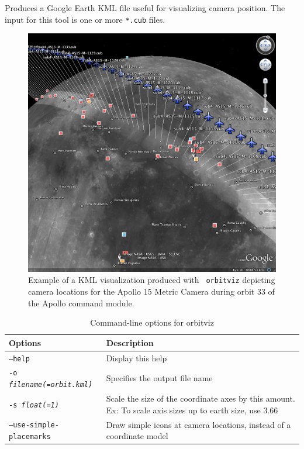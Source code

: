 Produces a Google Earth \ac{KML} file useful for visualizing camera
position. The input for this tool is one or more \texttt{*.cub} files.

\begin{figure}[ht]
  \begin{center}
  \includegraphics[width=6in]{images/orbitviz_ge_result.png}
  \end{center}
  \caption{ Example of a \ac{KML} visualization produced with {\tt
      orbitviz} depicting camera locations for the Apollo 15 Metric
    Camera during orbit 33 of the Apollo command module.}
  \label{fig:orbitviz_example}
\end{figure}

\begin{longtable}{|l|p{10cm}|}
\caption{Command-line options for orbitviz}
\label{tbl:orbitviz}
\endfirsthead
\endhead
\endfoot
\endlastfoot
\hline
Options & Description \\ \hline \hline
\texttt{--help} & Display this help \\ \hline
\texttt{-o \textit{filename(=orbit.kml)}} & Specifies the output file name \\ \hline
\texttt{-s \textit{float(=1)}} & Scale the size of the coordinate axes by this amount. Ex: To scale axis sizes up to earth size, use 3.66 \\ \hline
\texttt{--use-simple-placemarks} & Draw simple icons at camera locations, instead of a coordinate model \\ \hline
\end{longtable}



